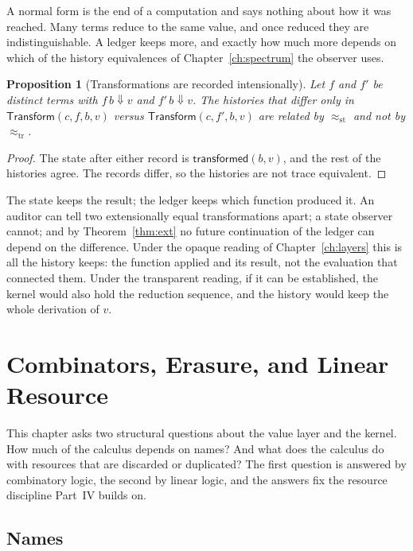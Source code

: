 \documentclass[11pt,openany]{book}
\newtheorem{proposition}[theorem]{Proposition}
\theoremstyle{remark}
\newcommand{\Transform}{\mathsf{Transform}}
\begin{document}
A normal form is the end of a computation and says nothing about how it
was reached. Many terms reduce to the same value, and once reduced they
are indistinguishable. A ledger keeps more, and exactly how much more
depends on which of the history equivalences of
Chapter~\ref{ch:spectrum} the observer uses.

\begin{proposition}[Transformations are recorded intensionally]
\label{prop:intensional}
Let $f$ and $f'$ be distinct terms with $f\,b\Downarrow v$ and
$f'\,b\Downarrow v$. The histories that differ only in
$\Transform(c,f,b,v)$ versus $\Transform(c,f',b,v)$ are related by
$\approx_{\mathrm{st}}$ and not by $\approx_{\mathrm{tr}}$.
\end{proposition}

\begin{proof}
The state after either record is $\mathsf{transformed}(b,v)$, and the
rest of the histories agree. The records differ, so the histories are not
trace equivalent.
\end{proof}

The state keeps the result; the ledger keeps which function produced it.
An auditor can tell two extensionally equal transformations apart; a
state observer cannot; and by Theorem~\ref{thm:ext} no future
continuation of the ledger can depend on the difference. Under the opaque
reading of Chapter~\ref{ch:layers} this is all the history keeps: the
function applied and its result, not the evaluation that connected them.
Under the transparent reading, if it can be established, the kernel would
also hold the reduction sequence, and the history would keep the whole
derivation of $v$.

\chapter{Combinators, Erasure, and Linear Resource}
\label{ch:combinators}

This chapter asks two structural questions about the value layer and the
kernel. How much of the calculus depends on names? And what does the
calculus do with resources that are discarded or duplicated? The first
question is answered by combinatory logic, the second by linear logic, and
the answers fix the resource discipline Part~IV builds on.

\section{Names}
\end{document}
